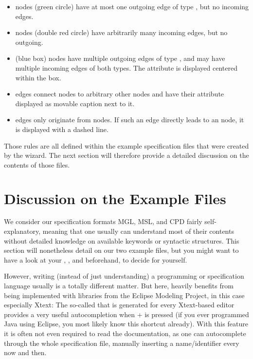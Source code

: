 \documentclass[a4paper,american,12pt]{scrreprt}
\begin{document}
\begin{itemize}
\item {} nodes (green circle) have at most one outgoing edge of type
	, but no incoming edges.
\item {} nodes (double red circle) have arbitrarily many incoming edges,
	but no outgoing.
\item {} (blue box) nodes have multiple outgoing edges of type
	, and may have multiple incoming edges of both types.
	The attribute  is displayed centered within the box.
\item {} edges connect  nodes to arbitrary other nodes and
	have their attribute  displayed as movable caption next to it.
\item {} edges only originate from  nodes. If such an
	edge directly leads to an  node, it is displayed with a dashed
	line.
\end{itemize}

Those rules are all defined within the example \cinco specification files that
were created by the wizard. The next section will therefore provide a detailed
discussion on the contents of those files.

\section{Discussion on the Example Files}
\label{sec:examplefiles}

We consider our specification formats MGL, MSL, and CPD fairly self-explanatory,
meaning that one usually can understand most of their contents without detailed
knowledge on available keywords or syntactic structures. This section
will nonetheless detail on our two example files, but you might want to have a look at
your , , and  beforehand, to decide for
yourself. 

However, writing (instead of just understanding) a programming or specification language usually is a totally
different matter. But here, \cinco heavily benefits from being implemented
with libraries from the Eclipse Modeling Project, in this case especially Xtext:
The so-called  that is generated for every Xtext-based
editor provides a very useful autocompletion when
+ is pressed (if you ever programmed Java using
Eclipse, you most likely know this shortcut already). With this feature it is
often not even required to read the documentation, as one can autocomplete
through the whole specification file, manually inserting a name/identifier every now and
then.
\end{document}
